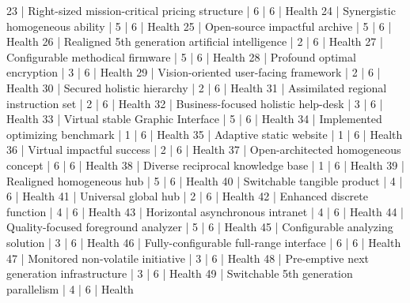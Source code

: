 \begin{enumerate}
\begin{pseudo*}
      23 | Right-sized mission-critical pricing structure   |        6 |      6 | Health        
      24 | Synergistic homogeneous ability                  |        5 |      6 | Health        
      25 | Open-source impactful archive                    |        5 |      6 | Health        
      26 | Realigned 5th generation artificial intelligence |        2 |      6 | Health        
      27 | Configurable methodical firmware                 |        5 |      6 | Health        
      28 | Profound optimal encryption                      |        3 |      6 | Health        
      29 | Vision-oriented user-facing framework            |        2 |      6 | Health        
      30 | Secured holistic hierarchy                       |        2 |      6 | Health        
      31 | Assimilated regional instruction set             |        2 |      6 | Health        
      32 | Business-focused holistic help-desk              |        3 |      6 | Health        
      33 | Virtual stable Graphic Interface                 |        5 |      6 | Health        
      34 | Implemented optimizing benchmark                 |        1 |      6 | Health        
      35 | Adaptive static website                          |        1 |      6 | Health        
      36 | Virtual impactful success                        |        2 |      6 | Health        
      37 | Open-architected homogeneous concept             |        6 |      6 | Health        
      38 | Diverse reciprocal knowledge base                |        1 |      6 | Health        
      39 | Realigned homogeneous hub                        |        5 |      6 | Health        
      40 | Switchable tangible product                      |        4 |      6 | Health        
      41 | Universal global hub                             |        2 |      6 | Health        
      42 | Enhanced discrete function                       |        4 |      6 | Health        
      43 | Horizontal asynchronous intranet                 |        4 |      6 | Health        
      44 | Quality-focused foreground analyzer              |        5 |      6 | Health        
      45 | Configurable analyzing solution                  |        3 |      6 | Health        
      46 | Fully-configurable full-range interface          |        6 |      6 | Health        
      47 | Monitored non-volatile initiative                |        3 |      6 | Health        
      48 | Pre-emptive next generation infrastructure       |        3 |      6 | Health        
      49 | Switchable 5th generation parallelism            |        4 |      6 | Health        

\end{pseudo*}
\end{enumerate}

